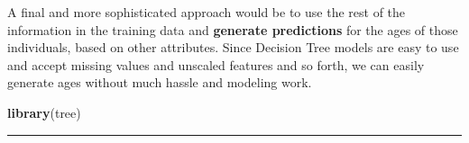 \documentclass[]{article}
\newenvironment{Shaded}{\begin{snugshade}}{\end{snugshade}}
\newcommand{\KeywordTok}[1]{\textcolor[rgb]{0.13,0.29,0.53}{\textbf{#1}}}
\newcommand{\NormalTok}[1]{#1}
\begin{document}
A final and more sophisticated approach would be to use the rest of the
information in the training data and \textbf{generate predictions} for
the ages of those individuals, based on other attributes. Since Decision
Tree models are easy to use and accept missing values and unscaled
features and so forth, we can easily generate ages without much hassle
and modeling work.

\begin{Shaded}
\begin{Highlighting}[]
\KeywordTok{library}\NormalTok{(tree)}
\end{Highlighting}
\end{Shaded}

\begin{center}\rule{0.5\linewidth}{\linethickness}\end{center}
\end{document}

